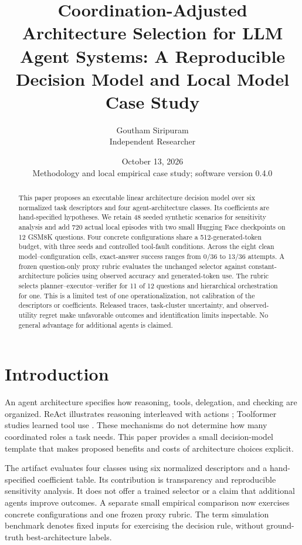 \documentclass[11pt]{article}
\title{Coordination-Adjusted Architecture Selection for LLM Agent Systems: A Reproducible Decision Model and Local Model Case Study}
\author{Goutham Siripuram\\Independent Researcher}
\date{October 13, 2026\\\small Methodology and local empirical case study; software version 0.4.0}
\begin{document}
\maketitle
\begin{abstract}
This paper proposes an executable linear architecture decision model over six normalized task descriptors and four agent-architecture classes. Its coefficients are hand-specified hypotheses. We retain 48 seeded synthetic scenarios for sensitivity analysis and add 720 actual local episodes with two small Hugging Face checkpoints on 12 GSM8K questions. Four concrete configurations share a 512-generated-token budget, with three seeds and controlled tool-fault conditions. Across the eight clean model--configuration cells, exact-answer success ranges from 0/36 to 13/36 attempts. A frozen question-only proxy rubric evaluates the unchanged selector against constant-architecture policies using observed accuracy and generated-token use. The rubric selects planner--executor--verifier for 11 of 12 questions and hierarchical orchestration for one. This is a limited test of one operationalization, not calibration of the descriptors or coefficients. Released traces, task-cluster uncertainty, and observed-utility regret make unfavorable outcomes and identification limits inspectable. No general advantage for additional agents is claimed.
\end{abstract}

\section{Introduction}
An agent architecture specifies how reasoning, tools, delegation, and checking are organized. ReAct illustrates reasoning interleaved with actions \cite{yao2023react}; Toolformer studies learned tool use \cite{schick2023toolformer}. These mechanisms do not determine how many coordinated roles a task needs. This paper provides a small decision-model template that makes proposed benefits and costs of architecture choices explicit.

The artifact evaluates four classes using six normalized descriptors and a hand-specified coefficient table. Its contribution is transparency and reproducible sensitivity analysis. It does not offer a trained selector or a claim that additional agents improve outcomes. A separate small empirical comparison now exercises concrete configurations and one frozen proxy rubric. The term simulation benchmark denotes fixed inputs for exercising the decision rule, without ground-truth best-architecture labels.
\end{document}
